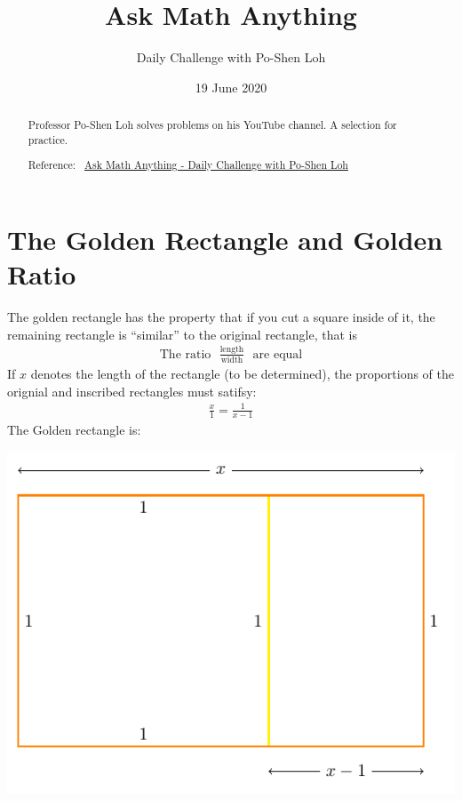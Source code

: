 \documentclass[12pt]{article}
\title{Ask Math Anything}
\author{Daily Challenge with Po-Shen Loh}
\date{19 June 2020}
\begin{document}
\begin{minipage}{\textwidth}
\maketitle
\begin{abstract}
Professor Po-Shen Loh solves problems on his YouTube channel. A selection for practice. 

Reference:~ 
\href{https://www.youtube.com/channel/UCf78EJOm4wQ4xXwSS15PuxQ}{Ask Math Anything - Daily Challenge with Po-Shen Loh}
\end{abstract}
\end{minipage}

\section{The Golden Rectangle and Golden Ratio}
The golden rectangle has the property that if you cut a square inside of it, the remaining rectangle is ``similar'' to the original rectangle, that is 
\begin{align*}
\text{The ratio}~~~ \frac{\text{length}}{\text{width}} ~~~\text{are equal}
\end{align*}
If $x$ denotes the length of the rectangle (to be determined), the proportions of the orignial and inscribed rectangles must satifsy:
\begin{align*}
\frac{x}{1} = \frac{1}{x-1}
\end{align*}
The Golden rectangle is:
\begin{center}
\includegraphics{tikz-rectangle-golden}
\end{center}
\end{document}
